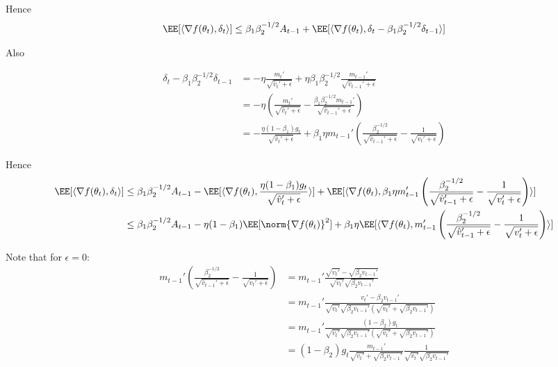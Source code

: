 \documentclass[11pt]{article}
\begin{document}
Hence 
\begin{align*}
\EE[\langle \nabla f(\theta_t), \delta_t\rangle] \leq  \beta_1\beta_2^{-1/2} A_{t-1}+ \EE[\langle \nabla f(\theta_t), \delta_t - \beta_1\beta_2^{-1/2} \delta_{t-1} \rangle]
\end{align*}

Also

\begin{align*}
\delta_t - \beta_1\beta_2^{-1/2} \delta_{t-1}  &= -\eta \frac{m_t'}{\sqrt{\hat v_t'+\epsilon}} + \eta \beta_1\beta_2^{-1/2}\frac{m_{t-1}'}{\sqrt{\hat v_{t-1}'+\epsilon}}\\
& = - \eta \left(\frac{m_t'}{\sqrt{\hat v_t'+\epsilon}} - \frac{\beta_1\beta_2^{-1/2}m_{t-1}'}{\sqrt{\hat v_{t-1}'+\epsilon}} \right)\\
& = - \frac{\eta (1-\beta_1) g_t}{\sqrt{\hat v_t'+\epsilon}} + \beta_1 \eta m_{t-1}' \left( \frac{\beta_2^{-1/2}}{\sqrt{\hat v_{t-1}'+\epsilon} }- \frac{1}{\sqrt{v_t' + \epsilon}}\right)
\end{align*}


Hence 
\begin{align*}
\EE[\langle \nabla f(\theta_t), \delta_t\rangle] &\leq  \beta_1\beta_2^{-1/2} A_{t-1}- \EE[\langle \nabla f(\theta_t), \frac{\eta (1-\beta_1) g_t}{\sqrt{\hat v_t'+\epsilon}}  \rangle] + \EE[\langle \nabla f(\theta_t), \beta_1 \eta m_{t-1}' \left( \frac{\beta_2^{-1/2}}{\sqrt{\hat v_{t-1}'+\epsilon} }- \frac{1}{\sqrt{v_t' + \epsilon}}\right) \rangle]\\
& \leq  \beta_1\beta_2^{-1/2} A_{t-1}- \eta (1-\beta_1) \EE[\norm{ \nabla f(\theta_t)}^2] +  \beta_1 \eta \EE[\langle \nabla f(\theta_t), m_{t-1}' \left( \frac{\beta_2^{-1/2}}{\sqrt{\hat v_{t-1}'+\epsilon} }- \frac{1}{\sqrt{v_t' + \epsilon}}\right) \rangle]
\end{align*}

Note that for $\epsilon=0$:
\begin{align*}
 m_{t-1}' \left( \frac{\beta_2^{-1/2}}{\sqrt{\hat v_{t-1}'+\epsilon} }- \frac{1}{\sqrt{v_t' + \epsilon}}\right)   &=  m_{t-1}' \frac{\sqrt{v_t'} - \sqrt{\beta_2 v_{t-1}'}}{\sqrt{v_t'}\sqrt{\beta_2 v_{t-1}'}} \\
 & = m_{t-1}' \frac{v_t' - \beta_2 v_{t-1}'}{\sqrt{v_t'}\sqrt{\beta_2 v_{t-1}'} (\sqrt{v_t'} + \sqrt{\beta_2 v_{t-1}'})} \\
 & = m_{t-1}'\frac{ (1- \beta_2) g_{t}}{\sqrt{v_t'}\sqrt{\beta_2 v_{t-1}'} (\sqrt{v_t'} + \sqrt{\beta_2 v_{t-1}'})}\\
  & = (1- \beta_2) g_{t} \frac{ m_{t-1}'}{\sqrt{v_t'} + \sqrt{\beta_2 v_{t-1}'}} \frac{1}{\sqrt{v_t'}\sqrt{\beta_2 v_{t-1}'}}
\end{align*}
\end{document}
